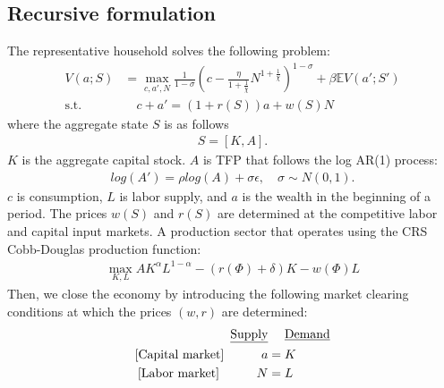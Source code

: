 \subsection*{Recursive formulation}
The representative household solves the following problem:
\begin{align*}
  V(a;S) &= \max_{c,a',N} \frac{1}{1-\sigma}\left(c-
  \frac{\eta}{1+\frac{1}{\chi}}N^{1+\frac{1}{\chi}}\right)^{1-\sigma} + \beta \mathbb{E}V(a';S')
  \\
  \text{s.t. }& \quad
  c+a' = (1+r(S))a + w(S)N
\end{align*}
where the aggregate state $S$ is as follows
\begin{align*}
  S = [K,A].
\end{align*}
$K$ is the aggregate capital stock. $A$ is TFP that follows the log AR(1) process:
\begin{align*}
  log(A') = \rho log(A) + \sigma\epsilon,\quad\sigma\sim N(0,1).
\end{align*}
$c$ is consumption, $L$ is labor supply, and $a$ is the wealth in the beginning of a period. %
The prices $w(S)$ and $r(S)$ are determined at the competitive labor and capital input markets.
A production sector that operates using the CRS Cobb-Douglas production function:
\begin{align*}
	\max_{K,L} A K^{\alpha}L^{1-\alpha} - (r(\Phi)+\delta)K - w(\Phi)L
\end{align*}
Then, we close the economy by introducing the following market clearing conditions at which the prices $(w,r)$ are determined:
\begin{align*}
	\text{\underline{Supply}}&\quad\text{ \underline{Demand}}
	\\
	\text{[Capital market]}\quad\qquad  a &= K
	\\
	\text{[Labor market]}\quad\qquad N &= L
\end{align*}

